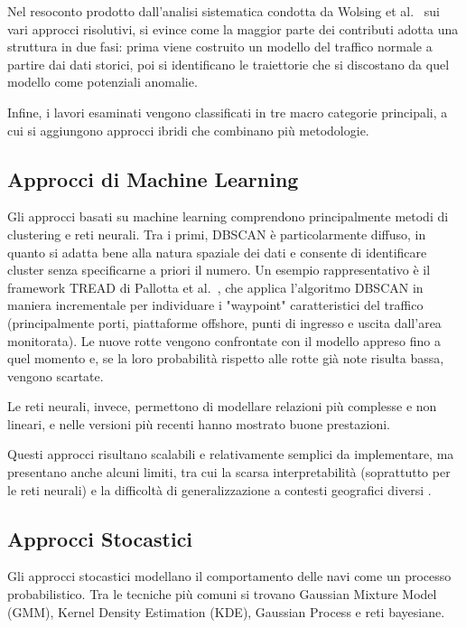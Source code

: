 Nel resoconto prodotto dall'analisi sistematica condotta da Wolsing et al.~\cite{riassuntone} sui vari approcci risolutivi, 
si evince come la maggior parte dei contributi adotta una struttura in due fasi: 
prima viene costruito un modello del traffico normale a partire dai dati storici,
poi si identificano le traiettorie che si discostano da quel modello come potenziali anomalie.

Infine, i lavori esaminati vengono classificati in tre macro categorie principali, a cui si aggiungono approcci ibridi che combinano
più metodologie.

\subsection{Approcci di Machine Learning}

Gli approcci basati su machine learning comprendono principalmente metodi di clustering e reti neurali. 
Tra i primi, DBSCAN è particolarmente diffuso, in quanto si adatta bene alla natura spaziale dei dati e 
consente di identificare cluster senza specificarne a priori il numero. Un esempio rappresentativo è il framework TREAD
di Pallotta et al.~\cite{pallotta}, che applica l'algoritmo DBSCAN in maniera incrementale per individuare i
"waypoint" caratteristici del traffico (principalmente porti, piattaforme offshore, punti di ingresso e uscita
dall'area monitorata). Le nuove rotte vengono confrontate con il modello appreso fino a quel momento e,
 se la loro probabilità rispetto alle rotte già note risulta bassa, vengono scartate.

Le reti neurali, invece, permettono di modellare relazioni più complesse e non lineari, 
e nelle versioni più recenti hanno mostrato buone prestazioni.

Questi approcci risultano scalabili e relativamente semplici da implementare, 
ma presentano anche alcuni limiti, tra cui la scarsa interpretabilità (soprattutto per le reti neurali) 
e la difficoltà di generalizzazione a contesti geografici diversi \cite{mascaro}.

\subsection{Approcci Stocastici}

Gli approcci stocastici modellano il comportamento delle navi come un processo probabilistico. 
Tra le tecniche più comuni si trovano Gaussian Mixture Model (GMM), Kernel Density Estimation (KDE), Gaussian Process e reti bayesiane.

